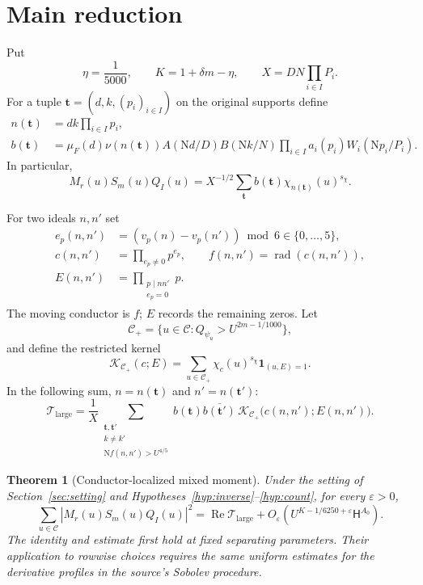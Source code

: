 \documentclass[11pt]{article}
\newtheorem{theorem}{Theorem}[section]
\theoremstyle{definition}
\theoremstyle{remark}
\numberwithin{equation}{section}
\newcommand{\Nm}{\mathrm N}
\newcommand{\CC}{\mathcal C}
\newcommand{\HH}{\mathsf H}
\newcommand{\ind}{\mathbf1}
\newcommand{\rad}{\operatorname{rad}}
\newcommand{\Rea}{\operatorname{Re}}
\newcommand{\ee}{\varepsilon}
\newcommand{\st}{\boldsymbol t}
\newcommand{\conj}[1]{\overline{#1}}
\newcommand{\Tlarge}{\mathcal T_{\mathrm{large}}}
\begin{document}
\section{Main reduction}\label{sec:main}

Put
\[
\eta=\frac1{5000},\qquad
K=1+\delta m-\eta,\qquad
X=DN\prod_{i\in I}P_i.
\]
For a tuple $\st=(d,k,(p_i)_{i\in I})$ on the original supports define
\begin{align}
n(\st)&=dk\prod_{i\in I}p_i,\label{eq:column}\\
b(\st)&=\mu_F(d)\nu(n(\st))A(\Nm d/D)B(\Nm k/N)
\prod_{i\in I}a_i(p_i)W_i(\Nm p_i/P_i).\label{eq:tuple-coeff}
\end{align}
In particular,
\begin{equation}\label{eq:product}
M_r(u)S_m(u)Q_I(u)
=X^{-1/2}\sum_{\st}b(\st)\chi_{n(\st)}(u)^{s_\chi}.
\end{equation}

For two ideals $n,n'$ set
\begin{align}
e_p(n,n')&=(v_p(n)-v_p(n'))\bmod6\in\{0,\ldots,5\},\nonumber\\
c(n,n')&=\prod_{e_p\ne0}p^{e_p},\qquad
f(n,n')=\rad(c(n,n')),\label{eq:ratio-data}\\
E(n,n')&=\prod_{\substack{p\mid nn'\\e_p=0}}p.\nonumber
\end{align}
The moving conductor is $f$; $E$ records the remaining zeros.
Let
\begin{equation}\label{eq:high-rows}
\CC_+=\{u\in\CC:Q_{\psi_u}>U^{2m-1/1000}\},
\end{equation}
and define the restricted kernel
\begin{equation}\label{eq:kernel}
\mathcal K_{\CC_+}(c;E)=
\sum_{u\in\CC_+}\chi_c(u)^{s_\chi}\ind_{(u,E)=1}.
\end{equation}
In the following sum, $n=n(\st)$ and $n'=n(\st')$:
\begin{equation}\label{eq:Tlarge}
\Tlarge=\frac1X
\sum_{\substack{\st,\st'\\k\ne k'\\
\Nm f(n,n')>U^{4/5}}}
b(\st)\conj{b(\st')}\,
\mathcal K_{\CC_+}\bigl(c(n,n');E(n,n')\bigr).
\end{equation}

\begin{theorem}[Conductor-localized mixed moment]\label{thm:main}
Under the setting of Section~\ref{sec:setting} and
Hypotheses~\ref{hyp:inverse}--\ref{hyp:count}, for every $\ee>0$,
\begin{equation}\label{eq:main}
\sum_{u\in\CC}|M_r(u)S_m(u)Q_I(u)|^2
=\Rea\Tlarge+
O_\ee\!\left(U^{K-1/6250+\ee}\HH^{A_0}\right).
\end{equation}
The identity and estimate first hold at fixed separating parameters.
Their application to rowwise choices requires the same uniform
estimates for the derivative profiles in the source's Sobolev procedure.
\end{theorem}
\end{document}
